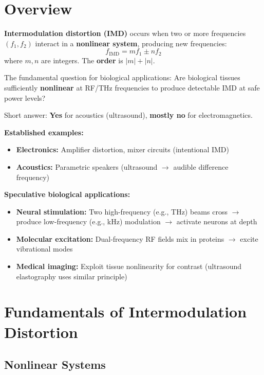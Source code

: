 \section{Overview}

\textbf{Intermodulation distortion (IMD)} occurs when two or more frequencies $(f_1, f_2)$ interact in a \textbf{nonlinear system}, producing new frequencies:
\begin{equation}
\label{eq:imd-general}
f_{\text{IMD}} = m f_1 \pm n f_2
\end{equation}
where $m, n$ are integers. The \textbf{order} is $|m| + |n|$.

\begin{keyconcept}
The fundamental question for biological applications: Are biological tissues sufficiently \textbf{nonlinear} at RF/THz frequencies to produce detectable IMD at safe power levels?

Short answer: \textbf{Yes} for acoustics (ultrasound), \textbf{mostly no} for electromagnetics.
\end{keyconcept}

\textbf{Established examples:}
\begin{itemize}
\item \textbf{Electronics:} Amplifier distortion, mixer circuits (intentional IMD)
\item \textbf{Acoustics:} Parametric speakers (ultrasound $\rightarrow$ audible difference frequency)
\end{itemize}

\textbf{Speculative biological applications:}
\begin{itemize}
\item \textbf{Neural stimulation:} Two high-frequency (e.g., THz) beams cross $\rightarrow$ produce low-frequency (e.g., kHz) modulation $\rightarrow$ activate neurons at depth
\item \textbf{Molecular excitation:} Dual-frequency RF fields mix in proteins $\rightarrow$ excite vibrational modes
\item \textbf{Medical imaging:} Exploit tissue nonlinearity for contrast (ultrasound elastography uses similar principle)
\end{itemize}

\section{Fundamentals of Intermodulation Distortion}

\subsection{Nonlinear Systems}

